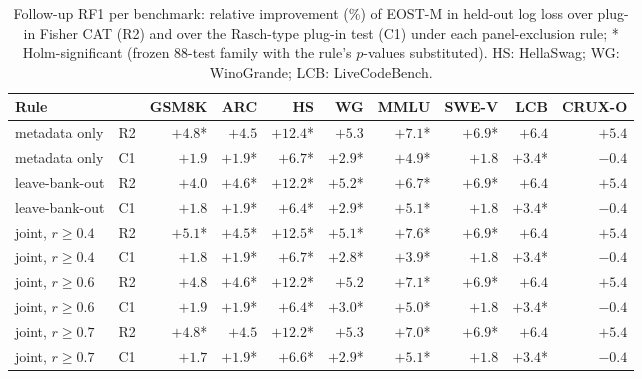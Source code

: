 \begin{table}[tbp]
\centering\scriptsize
\caption{Follow-up RF1 per benchmark: relative improvement (\%) of EOST-M in held-out log loss over plug-in Fisher CAT (R2) and over the Rasch-type plug-in test (C1) under each panel-exclusion rule; * Holm-significant (frozen 88-test family with the rule's $p$-values substituted). HS: HellaSwag; WG: WinoGrande; LCB: LiveCodeBench.}
\label{tab:robclustbanks}
\setlength{\tabcolsep}{2.5pt}
\begin{tabular}{@{}llrrrrrrrr@{}}
\toprule
Rule & & GSM8K & ARC & HS & WG & MMLU & SWE-V & LCB & CRUX-O \\
\midrule
metadata only & R2 & $+4.8$* & $+4.5$ & $+12.4$* & $+5.3$ & $+7.1$* & $+6.9$* & $+6.4$ & $+5.4$ \\
metadata only & C1 & $+1.9$ & $+1.9$* & $+6.7$* & $+2.9$* & $+4.9$* & $+1.8$ & $+3.4$* & $-0.4$ \\
leave-bank-out & R2 & $+4.0$ & $+4.6$* & $+12.2$* & $+5.2$* & $+6.7$* & $+6.9$* & $+6.4$ & $+5.4$ \\
leave-bank-out & C1 & $+1.8$ & $+1.9$* & $+6.4$* & $+2.9$* & $+5.1$* & $+1.8$ & $+3.4$* & $-0.4$ \\
joint, $r\ge0.4$ & R2 & $+5.1$* & $+4.5$* & $+12.5$* & $+5.1$* & $+7.6$* & $+6.9$* & $+6.4$ & $+5.4$ \\
joint, $r\ge0.4$ & C1 & $+1.8$ & $+1.9$* & $+6.7$* & $+2.8$* & $+3.9$* & $+1.8$ & $+3.4$* & $-0.4$ \\
joint, $r\ge0.6$ & R2 & $+4.8$ & $+4.6$* & $+12.2$* & $+5.2$ & $+7.1$* & $+6.9$* & $+6.4$ & $+5.4$ \\
joint, $r\ge0.6$ & C1 & $+1.9$ & $+1.9$* & $+6.4$* & $+3.0$* & $+5.0$* & $+1.8$ & $+3.4$* & $-0.4$ \\
joint, $r\ge0.7$ & R2 & $+4.8$* & $+4.5$ & $+12.2$* & $+5.3$ & $+7.0$* & $+6.9$* & $+6.4$ & $+5.4$ \\
joint, $r\ge0.7$ & C1 & $+1.7$ & $+1.9$* & $+6.6$* & $+2.9$* & $+5.1$* & $+1.8$ & $+3.4$* & $-0.4$ \\
\bottomrule
\end{tabular}
\end{table}
